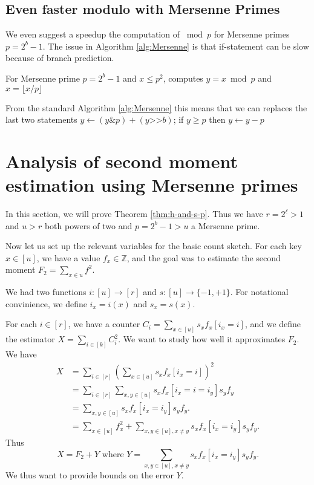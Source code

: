 \documentclass[12pt]{article}
\newcommand{\floor}[1]{\lfloor {#1} \rfloor}
\newcommand\fct\rightarrow
\newcommand\Z{\mathbb Z}
\begin{document}
\subsection{Even faster modulo with Mersenne Primes}
We even suggest a speedup the computation of $\bmod p$ for Mersenne primes
$p=2^b-1$. The issue in Algorithm \ref{alg:Mersenne} is that
if-statement can be slow because of branch prediction. 
\begin{algorithm}
  \caption{For Mersenne prime $p=2^b-1$ and $x\leq p^2$, computes
    $y=x\bmod p$ and $x=\floor{x/p}$}
\end{algorithm}
From the standard Algorithm \ref{alg:Mersenne} this means that we can
replaces the last two statements
$y\gets (y\texttt\&p)+(y\texttt{>>}b)$;
if $y\geq p$ then {$y\gets y-p$}





\section{Analysis of second moment estimation using  Mersenne primes}\label{sec:analysis-two-for-one}
In this section, we will prove Theorem \ref{thm:h-and-s-p}.  Thus we
have $r=2^\ell>1$ and $u>r$ both powers of two and $p=2^b-1>u$ a
Mersenne prime.

Now let us set up the relevant variables for the basic count sketch.
For each key $x\in [u]$, we have a value $f_x\in \Z$, and the
goal was to estimate the second moment $F_2=\sum_{x\in u}f^2$.

We had two functions $i:[u]\fct[r]$ and $s:[u]\fct\{-1,+1\}$. 
For notational convinience, we define $i_x=i(x)$ and $s_x=s(x)$.

For each $i\in [r]$, we have a counter 
$C_i=\sum_{x\in[u]} s_x f_x[i_x=i]$, and we define the 
estimator $X=\sum_{i\in[k]} C_i^2$. We want to study how
well it approximates $F_2$.
We have 
\begin{align*}
X&=\sum_{i\in[r]}\left( \sum_{x\in[u]}s_x f_x[i_x=i]\right)^2\\
&=\sum_{i\in[r]}\sum_{x,y\in[u]}s_x f_x[i_x=i=i_y]s_y f_y\\
&=\sum_{x,y\in[u]}s_x f_x[i_x=i_y]s_y f_y.\\
&=\sum_{x\in[u]} f_x^2+\sum_{x,y\in[u],x\neq y}
s_x f_x[i_x=i_y]s_y f_y.
\end{align*}
Thus 
\begin{equation}\label{eq:decomp}
X=F_2+Y\mbox{ where }Y=\sum_{x,y\in[u],x\neq y}
s_x f_x[i_x=i_y]s_y f_y.
\end{equation}
We thus want to provide bounds on the error $Y$.
\end{document}
